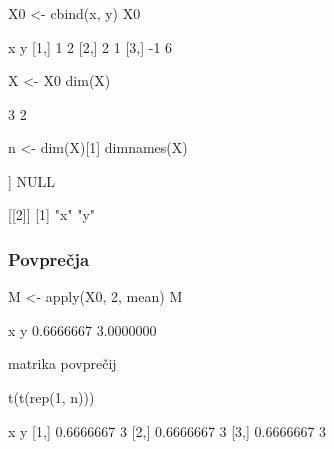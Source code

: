 \begin{frame}[fragile]
\frametitle{}
\begin{Schunk}
\begin{Sinput}
 X0 <- cbind(x, y)
 X0
\end{Sinput}
\begin{Soutput}
      x y
[1,]  1 2
[2,]  2 1
[3,] -1 6
\end{Soutput}
\begin{Sinput}
 X <- X0
 dim(X)
\end{Sinput}
\begin{Soutput}
[1] 3 2
\end{Soutput}
\begin{Sinput}
 n <- dim(X)[1]
 dimnames(X)
\end{Sinput}
\begin{Soutput}
[[1]]
NULL

[[2]]
[1] "x" "y"
\end{Soutput}
\end{Schunk}
\end{frame}



\begin{frame}[fragile]
\frametitle{Povprečja}
\begin{Schunk}
\begin{Sinput}
 M <- apply(X0, 2, mean)
 M
\end{Sinput}
\begin{Soutput}
        x         y 
0.6666667 3.0000000 
\end{Soutput}
\end{Schunk}
matrika povprečij
\begin{Schunk}
\begin{Sinput}
 t(t(rep(1, n))) %*% t(M)
\end{Sinput}
\begin{Soutput}
             x y
[1,] 0.6666667 3
[2,] 0.6666667 3
[3,] 0.6666667 3
\end{Soutput}
\end{Schunk}


\end{frame}

